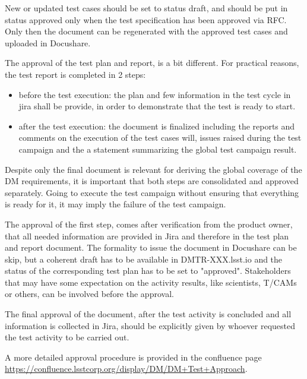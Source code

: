 New or updated test cases should be set to status draft, and should be put in status approved only when the test specification has been approved via RFC.
Only then the document can be regenerated with the approved test cases and uploaded in Docushare.

The approval of the test plan and report, is a bit different.
For practical reasons, the test report is completed in 2 steps:

\begin{itemize}
\item before the test execution: the plan and few information in the test cycle in jira shall be provide, in order to demonstrate that the test is ready to start. 
\item after the test execution: the document is finalized including the reports and comments on the execution of the test cases will, issues raised during the test campaign  and the a statement summarizing the global test campaign result.
\end{itemize}

Despite only the final document is relevant for deriving the global coverage of the DM requirements, it is important that both steps are consolidated and approved separately. 
Going to execute the test campaign without ensuring that everything is ready for it, it may imply the failure of the test campaign. 

The approval of the first step, comes after verification from the product owner, that all needed information are provided in Jira and therefore in the test plan and report document. 
The formality to issue the document in Docushare can be skip, but a coherent draft has to be available in DMTR-XXX.lsst.io and the status of the corresponding test plan has to be set to "approved". 
Stakeholders that may have some expectation on the activity results, like scientists, T/CAMs or others, can be involved before the approval.

The final approval of the document, after the test activity is concluded and all information is collected in Jira, should be explicitly given by whoever requested the test activity to be carried out.


A more detailed approval procedure is provided in the confluence page \url{https://confluence.lsstcorp.org/display/DM/DM+Test+Approach}.



